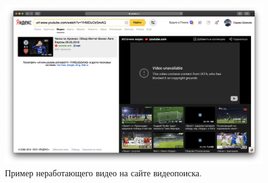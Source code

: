 \begin{figure}
    \centering
    \includegraphics[width=\textwidth]{images/yandex_video_bad}
    \caption{Пример неработающего видео на сайте видеопоиска.}
    \label{fig:yandex_video_bad}
\end{figure}